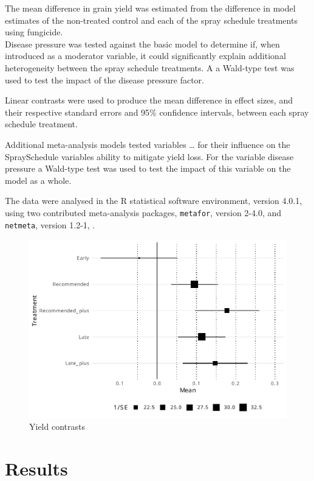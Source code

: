 \documentclass[agronomy,article,submit,moreauthors,pdftex]{mdpi}
\begin{document}
The mean difference in grain yield was estimated from the difference in model estimates of the non-treated control and each of the spray schedule treatments using fungicide.\\
Disease pressure was tested against the basic model to determine if, when introduced as a moderator variable, it could significantly explain additional heterogeneity between the spray schedule treatments.
A a Wald-type test was used to test the impact of the disease pressure factor.

Linear contrasts were used to produce the mean difference in effect sizes, and their respective standard errors and 95\% confidence intervals, between each spray schedule treatment.

Additional meta-analysis models tested variables \ldots{} for their influence on the SpraySchedule variables ability to mitigate yield loss.
For the variable disease pressure a Wald-type test was used to test the impact of this variable on the model as a whole.

The data were analysed in the R statistical software environment, version 4.0.1, \citep{RCoreTeam2020} using two contributed meta-analysis packages, \texttt{metafor}, version 2-4.0, \citep{Viechtbauer2010} and \texttt{netmeta}, version 1.2-1, \citep{Rucker2020}.

\begin{figure}
\centering
\includegraphics{paper_files/figure-latex/Figure1-1.pdf}
\caption{\label{fig:Figure1}Yield contrasts}
\end{figure}

\hypertarget{results}{%
\section{Results}\label{results}}
\end{document}
